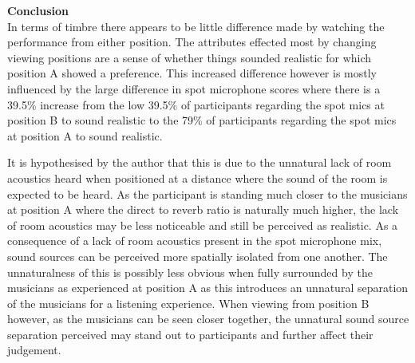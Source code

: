 	\textbf{Conclusion} \\

		In terms of timbre there appears to be little difference made by watching the performance from either position. The attributes effected most by changing viewing positions are a sense of whether things sounded realistic for which position A showed a preference. This increased difference however is mostly influenced by the large difference in spot microphone scores where there is a 39.5\% increase from the low 39.5\% of participants regarding the spot mics at position B to sound realistic to the 79\% of participants regarding the spot mics at position A to sound realistic. 

		It is hypothesised by the author that this is due to the unnatural lack of room acoustics heard when positioned at a distance where the sound of the room is expected to be heard. As the participant is standing much closer to the musicians at position A where the direct to reverb ratio is naturally much higher, the lack of room acoustics may be less noticeable and still be perceived as realistic. As a consequence of a lack of room acoustics present in the spot microphone mix, sound sources can be perceived more spatially isolated from one another. The unnaturalness of this is possibly less obvious when fully surrounded by the musicians as experienced at position A as this introduces an unnatural separation of the musicians for a listening experience. When viewing from position B however, as the musicians can be seen closer together, the unnatural sound source separation perceived may stand out to participants and further affect their judgement. \\


